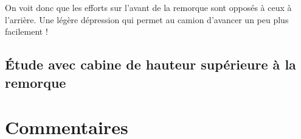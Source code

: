 On voit donc que les efforts sur l'avant de la remorque sont opposés à ceux à l'arrière. Une légère dépression qui permet au camion d'avancer un peu plus facilement ! 

\subsection{Étude avec cabine de hauteur supérieure à la remorque}

\section{Commentaires}
